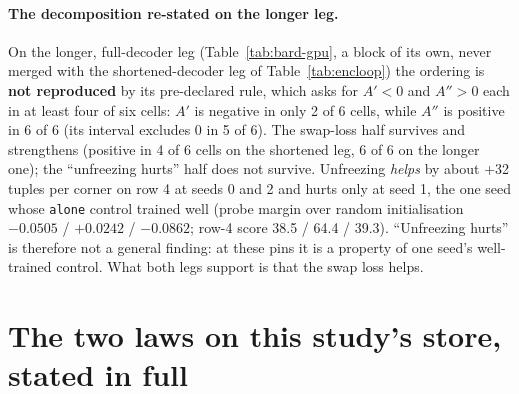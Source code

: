 \documentclass{article} %
\begin{document}
\paragraph{The decomposition re-stated on the longer leg.} On the
longer, full-decoder leg (Table~\ref{tab:bard-gpu}, a block of its own, never merged with the
shortened-decoder leg of Table~\ref{tab:encloop}) the ordering is \textbf{not reproduced} by its
pre-declared rule, which asks for $A'<0$ and $A''>0$ each in at least four of six cells: $A'$ is
negative in only 2 of 6 cells, while $A''$ is positive in 6 of 6 (its interval excludes 0 in 5 of %
6). The swap-loss half survives and strengthens (positive in 4 of 6 cells on the shortened leg, 6 %
of 6 on the longer one); the ``unfreezing hurts'' half does not survive. Unfreezing \emph{helps} by
about +32 tuples per corner on row 4 at seeds 0 and 2 and hurts only at seed 1, the one seed whose %
\texttt{alone} control trained well (probe margin over random initialisation $-0.0505$ / %
$+0.0242$ / $-0.0862$; row-4 score 38.5 / 64.4 / 39.3). ``Unfreezing hurts'' is therefore not a %
general finding: at these pins it is a property of one seed's well-trained control. What both legs
support is that the swap loss helps.

\section{The two laws on this study's store, stated in full}
\label{app:laws}
\end{document}
